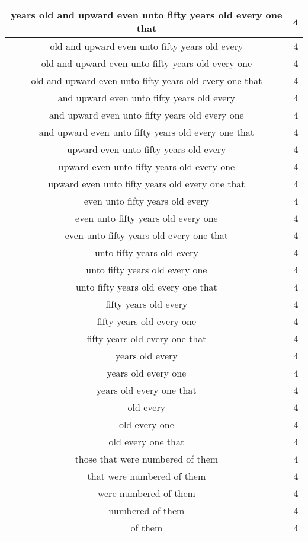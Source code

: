 \begin{center}
\begin{longtable}{|c|c|}
years old and upward even unto fifty years old every one that & 4\\ \hline 
old and upward even unto fifty years old every & 4\\ \hline 
old and upward even unto fifty years old every one & 4\\ \hline 
old and upward even unto fifty years old every one that & 4\\ \hline 
and upward even unto fifty years old every & 4\\ \hline 
and upward even unto fifty years old every one & 4\\ \hline 
and upward even unto fifty years old every one that & 4\\ \hline 
upward even unto fifty years old every & 4\\ \hline 
upward even unto fifty years old every one & 4\\ \hline 
upward even unto fifty years old every one that & 4\\ \hline 
even unto fifty years old every & 4\\ \hline 
even unto fifty years old every one & 4\\ \hline 
even unto fifty years old every one that & 4\\ \hline 
unto fifty years old every & 4\\ \hline 
unto fifty years old every one & 4\\ \hline 
unto fifty years old every one that & 4\\ \hline 
fifty years old every & 4\\ \hline 
fifty years old every one & 4\\ \hline 
fifty years old every one that & 4\\ \hline 
years old every & 4\\ \hline 
years old every one & 4\\ \hline 
years old every one that & 4\\ \hline 
old every & 4\\ \hline 
old every one & 4\\ \hline 
old every one that & 4\\ \hline 
those that were numbered of them & 4\\ \hline 
that were numbered of them & 4\\ \hline 
were numbered of them & 4\\ \hline 
numbered of them & 4\\ \hline 
of them & 4\\ \hline 

\end{longtable}
\end{center}
